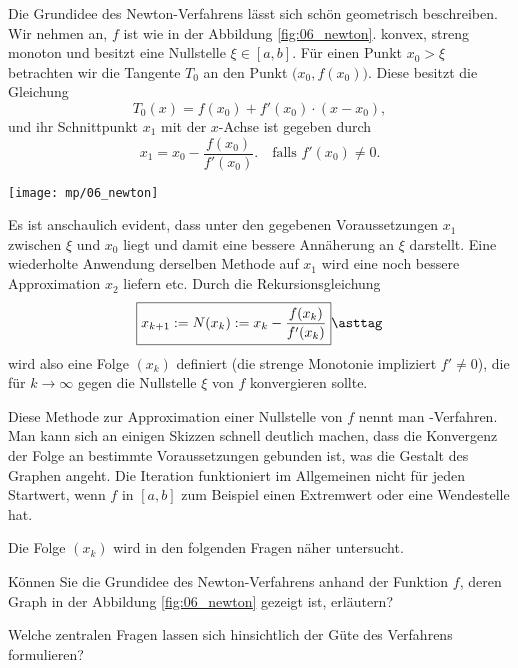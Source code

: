 \begin{antwort}
  Die Grundidee des Newton-Verfahrens lässt sich schön  
  geometrisch beschreiben. Wir nehmen an, 
  $f$ ist wie in der Abbildung \ref{fig:06_newton}.  
  konvex, streng monoton und besitzt eine Nullstelle 
  $\xi\in [a,b]$. Für 
  einen Punkt $x_0>\xi$ betrachten wir die Tangente 
  $T_0$ an den Punkt $\big(x_0,f(x_0) \big)$. 
  Diese besitzt die Gleichung 
  \[
  T_0(x) = f(x_0)+f'(x_0)\cdot (x-x_0 ),
  \]
  und ihr Schnittpunkt $x_1$ mit der $x$-Achse ist gegeben durch 
  \[
  x_1 =  x_0 - \frac{f(x_0)}{f'(x_0)}. \quad\text{falls $f'(x_0)\not=0$.}
  \]

  \begin{center}
    \texttt{[image: mp/06\_newton]}
    \label{fig:06_newton}
  \end{center}

  Es ist anschaulich evident, dass unter den gegebenen  
  Voraussetzungen $x_1$ zwischen $\xi$ und $x_0$ 
  liegt und damit eine bessere Annäherung an 
  $\xi$ darstellt. Eine wiederholte Anwendung derselben 
  Methode auf $x_1$ wird eine noch bessere Approximation $x_2$ 
  liefern etc. Durch die Rekursionsgleichung 
  \begin{equation}
    \boxed{
      x_{k+1} := N(x_k) := x_k - \frac{f(x_k)}{f'(x_k)} }
    \asttag
  \end{equation}
  wird also eine Folge $(x_k)$ definiert 
  (die strenge Monotonie impliziert $f'\not=0$), 
  die für $k\to\infty$ gegen die Nullstelle $\xi$ 
  von $f$ konvergieren sollte. 

  Diese Methode zur Approximation einer Nullstelle von $f$ nennt man 
  -Verfahren. Man kann sich an einigen Skizzen 
  schnell deutlich machen, dass die Konvergenz der Folge 
  an bestimmte Voraussetzungen gebunden ist, was 
  die Gestalt des Graphen angeht. 
  Die Iteration funktioniert im Allgemeinen nicht für 
  jeden Startwert, wenn $f$ in $[a,b]$ zum Beispiel 
  einen Extremwert oder eine Wendestelle hat. 

  Die Folge $(x_k)$ wird in den folgenden Fragen näher untersucht.
  \AntEnd 
\end{antwort}


\begin{frage}\label{07_newtondef}
  Können Sie die Grundidee des Newton-Verfahrens anhand der Funktion $f$, 
  deren Graph in der Abbildung \ref{fig:06_newton} gezeigt ist, erläutern? 

  Welche zentralen Fragen lassen sich hinsichtlich der 
  Güte des Verfahrens formulieren?
\end{frage}

